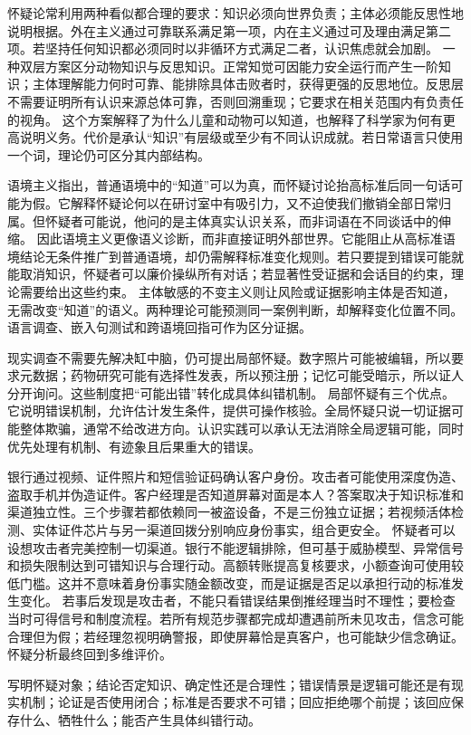 怀疑论常利用两种看似都合理的要求：知识必须向世界负责；主体必须能反思性地说明根据。外在主义通过可靠联系满足第一项，内在主义通过可及理由满足第二项。若坚持任何知识都必须同时以非循环方式满足二者，认识焦虑就会加剧\parencite{pritchard2016}。 一种双层方案区分动物知识与反思知识。正常知觉可因能力安全运行而产生一阶知识；主体理解能力何时可靠、能排除具体击败者时，获得更强的反思地位。反思层不需要证明所有认识来源总体可靠，否则回溯重现；它要求在相关范围内有负责任的视角。 这个方案解释了为什么儿童和动物可以知道，也解释了科学家为何有更高说明义务。代价是承认“知识”有层级或至少有不同认识成就。若日常语言只使用一个词，理论仍可区分其内部结构。

语境主义指出，普通语境中的“知道”可以为真，而怀疑讨论抬高标准后同一句话可能为假。它解释怀疑论何以在研讨室中有吸引力，又不迫使我们撤销全部日常归属。但怀疑者可能说，他问的是主体真实认识关系，而非词语在不同谈话中的伸缩。 因此语境主义更像语义诊断，而非直接证明外部世界。它能阻止从高标准语境结论无条件推广到普通语境，却仍需解释标准变化规则。若只要提到错误可能就能取消知识，怀疑者可以廉价操纵所有对话；若显著性受证据和会话目的约束，理论需要给出这些约束。 主体敏感的不变主义则让风险或证据影响主体是否知道，无需改变“知道”的语义。两种理论可能预测同一案例判断，却解释变化位置不同。语言调查、嵌入句测试和跨语境回指可作为区分证据。

现实调查不需要先解决缸中脑，仍可提出局部怀疑。数字照片可能被编辑，所以要求元数据；药物研究可能有选择性发表，所以预注册；记忆可能受暗示，所以证人分开询问。这些制度把“可能出错”转化成具体纠错机制。 局部怀疑有三个优点。它说明错误机制，允许估计发生条件，提供可操作核验。全局怀疑只说一切证据可能整体欺骗，通常不给改进方向。认识实践可以承认无法消除全局逻辑可能，同时优先处理有机制、有迹象且后果重大的错误。

银行通过视频、证件照片和短信验证码确认客户身份。攻击者可能使用深度伪造、盗取手机并伪造证件。客户经理是否知道屏幕对面是本人？答案取决于知识标准和渠道独立性。三个步骤若都依赖同一被盗设备，不是三份独立证据；若视频活体检测、实体证件芯片与另一渠道回拨分别响应身份事实，组合更安全。 怀疑者可以设想攻击者完美控制一切渠道。银行不能逻辑排除，但可基于威胁模型、异常信号和损失限制达到可错知识与合理行动。高额转账提高复核要求，小额查询可使用较低门槛。这并不意味着身份事实随金额改变，而是证据是否足以承担行动的标准发生变化。 若事后发现是攻击者，不能只看错误结果倒推经理当时不理性；要检查当时可得信号和制度流程。若所有规范步骤都完成却遭遇前所未见攻击，信念可能合理但为假；若经理忽视明确警报，即使屏幕恰是真客户，也可能缺少信念确证。怀疑分析最终回到多维评价。

\begin{tcolorbox}[breakable,colback=white,colframe=blue!30!black,title={怀疑论诊断表},fonttitle=\bfseries]
写明怀疑对象；结论否定知识、确定性还是合理性；错误情景是逻辑可能还是有现实机制；论证是否使用闭合；标准是否要求不可错；回应拒绝哪个前提；该回应保存什么、牺牲什么；能否产生具体纠错行动。
\end{tcolorbox}
